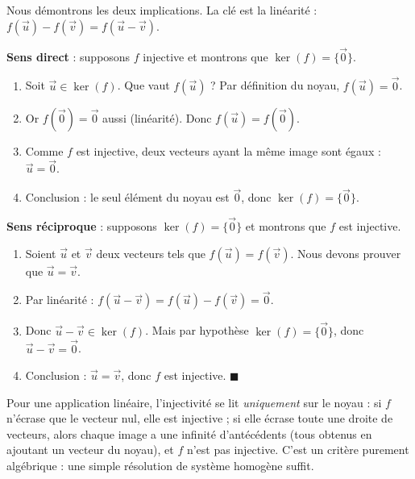 \documentclass[11pt]{article}
\begin{document}
\begin{experience}
Nous démontrons les deux implications. La clé est la linéarité : $f(\vec{u}) - f(\vec{v}) = f(\vec{u} - \vec{v})$.

\textbf{Sens direct} : supposons $f$ injective et montrons que $\ker(f) = \{\vec{0}\}$.
\begin{enumerate}
\item Soit $\vec{u} \in \ker(f)$. Que vaut $f(\vec{u})$ ? Par définition du noyau, $f(\vec{u}) = \vec{0}$.
\item Or $f(\vec{0}) = \vec{0}$ aussi (linéarité). Donc $f(\vec{u}) = f(\vec{0})$.
\item Comme $f$ est injective, deux vecteurs ayant la même image sont égaux : $\vec{u} = \vec{0}$.
\item Conclusion : le seul élément du noyau est $\vec{0}$, donc $\ker(f) = \{\vec{0}\}$.
\end{enumerate}

\textbf{Sens réciproque} : supposons $\ker(f) = \{\vec{0}\}$ et montrons que $f$ est injective.
\begin{enumerate}
\item Soient $\vec{u}$ et $\vec{v}$ deux vecteurs tels que $f(\vec{u}) = f(\vec{v})$. Nous devons prouver que $\vec{u} = \vec{v}$.
\item Par linéarité : $f(\vec{u} - \vec{v}) = f(\vec{u}) - f(\vec{v}) = \vec{0}$.
\item Donc $\vec{u} - \vec{v} \in \ker(f)$. Mais par hypothèse $\ker(f) = \{\vec{0}\}$, donc $\vec{u} - \vec{v} = \vec{0}$.
\item Conclusion : $\vec{u} = \vec{v}$, donc $f$ est injective. $\blacksquare$
\end{enumerate}
\end{experience}

\begin{aretenir}
Pour une application linéaire, l'injectivité se lit \emph{uniquement} sur le noyau : si $f$ n'écrase que le vecteur nul, elle est injective ; si elle écrase toute une droite de vecteurs, alors chaque image a une infinité d'antécédents (tous obtenus en ajoutant un vecteur du noyau), et $f$ n'est pas injective. C'est un critère purement algébrique : une simple résolution de système homogène suffit.
\end{aretenir}
\end{document}
